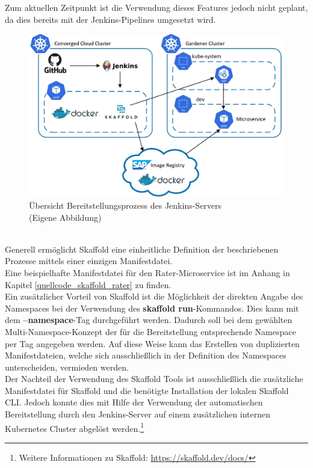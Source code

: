 Zum aktuellen Zeitpunkt ist die Verwendung dieses Features jedoch nicht geplant, da dies bereits mit der Jenkins-Pipelines umgesetzt wird.
\\
\begin{figure}[h]
	\begin{center}
		\includegraphics[width=16cm]{img/CI_CD_Integration.JPG}
		\caption[Übersicht Bereitstellungsprozess des Jenkins-Servers]{Übersicht Bereitstellungsprozess des Jenkins-Servers \\
			(Eigene Abbildung)}
		\label{picture_ci_cd_process}
	\end{center}
\end{figure}
\\
Generell ermöglicht Skaffold eine einheitliche Definition der beschriebenen Prozesse mittels einer einzigen Manifestdatei. \\
Eine beispielhafte Manifestdatei für den Rater-Microservice ist im Anhang in Kapitel \ref{quellcode_skaffold_rater} zu finden.\\
Ein zusätzlicher Vorteil von Skaffold ist die Möglichkeit der direkten Angabe des Namespaces bei der Verwendung des \textbf{skaffold run}-Kommandos. Dies kann mit dem \textbf{--namespace}-Tag durchgeführt werden. Dadurch soll bei dem gewählten Multi-Namespace-Konzept der für die Bereitstellung entsprechende Namespace per Tag angegeben werden. Auf diese Weise kann das Erstellen von duplizierten Manifestdateien, welche sich ausschließlich in der Definition des Namespaces unterscheiden, vermieden werden.\\
\newpage
Der Nachteil der Verwendung des Skaffold Tools ist ausschließlich die zusätzliche Manifestdatei für Skaffold und die benötigte Installation der lokalen Skaffold \ac{CLI}. Jedoch konnte dies mit Hilfe der Verwendung der automatischen Bereitstellung durch den Jenkins-Server auf einem zusätzlichen internen Kubernetes Cluster abgelöst werden.\footnote{Weitere Informationen zu Skaffold: \url{https://skaffold.dev/docs/}}\\ 

